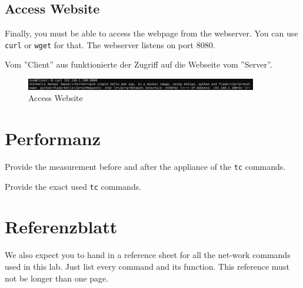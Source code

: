 \documentclass[11pt,titlepage]{article}
\newenvironment{shadedquotation}
 {\begin{shaded*}
  \quoting[leftmargin=0pt, vskip=0pt]
 }
 {\endquoting
 \end{shaded*}
}
\begin{document}
\subsection{Access Website}
\label{subsec:AccessWebsite}
\begin{shadedquotation}
  Finally, you must be able to access the webpage from the webserver. You can use \lstinline!curl! or \lstinline!wget! for that. The webserver listens on port 8080.
\end{shadedquotation}
Vom ''Client'' aus funktionierte der Zugriff auf die Webseite vom ''Server''.
\begin{figure}[H]
	\begin{center}
		\includegraphics[width=0.90\textwidth]{"images/Verifikation Access Website"}
		\caption{Access Website}
		\label{fig:verifikation-access-website}
	\end{center}
\end{figure}

\section{Performanz}
\label{sec:Performanz}
\begin{shadedquotation}
  Provide the measurement before and after the appliance of the \lstinline!tc! commands.
  
  Provide the exact used \lstinline!tc! commands.
\end{shadedquotation}

\section{Referenzblatt}
\label{sec:Referenzblatt}
\begin{shadedquotation}
  We also expect you to hand in a reference sheet for all the net-work commands used in this lab. Just list every command and its function. This reference must not be longer than one page.
\end{shadedquotation}

\par\medskip 
\end{document}
